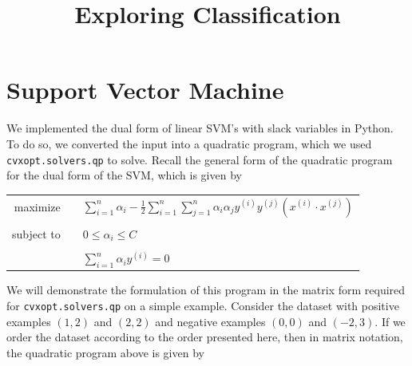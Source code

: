 \documentclass{sigchi}
\begin{document}
\title{Exploring Classification}


\maketitle

\large

\section{Support Vector Machine}

We implemented the dual form of linear SVM's with slack variables in Python. To do so, we converted the input into a quadratic program, which we used \texttt{cvxopt.solvers.qp} to solve. Recall the general form of the quadratic program for the dual form of the SVM, which is given by

\normalsize
\begin{center}\begin{tabular}{r p{0.0in} l }
maximize && $ \displaystyle \sum_{i =1}^n \alpha_i - \frac{1}{2}\sum_{i = 1}^{n}\sum_{j = 1}^n \alpha_i\alpha_jy^{(i)}y^{(j)}(x^{(i)}\cdot x^{(j)}) $
\\ && \\
subject to && $ \displaystyle 0 \leq \alpha_i \leq C$ 
\\ && \\
&&		      $ \displaystyle \sum_{i = 1}^{n} \alpha_iy^{(i)} = 0$
\end{tabular}\end{center}

\large

We will demonstrate the formulation of this program in the matrix form required for \texttt{cvxopt.solvers.qp} on a simple example. Consider the dataset with positive examples $(1, 2)$ and $(2, 2)$ and negative examples $(0, 0)$ and $(-2, 3)$.
If we order the dataset according to the order presented here, then in matrix notation, the quadratic program above is given by
\end{document}
